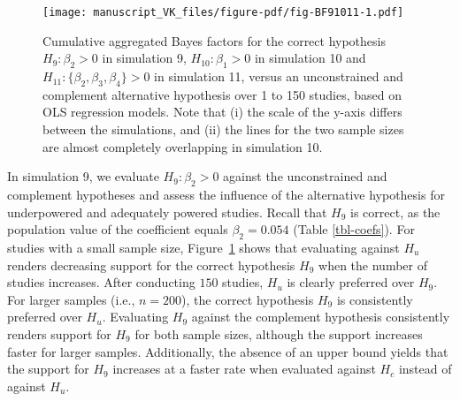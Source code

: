 \documentclass[
]{interact}
\begin{document}
                    \begin{figure}[!h]
                    
                    {\centering \texttt{[image: manuscript\_VK\_files/figure-pdf/fig-BF91011-1.pdf]}
                      
                    }
                    
                    \caption{\label{fig-BF91011}Cumulative aggregated Bayes factors for the
                      correct hypothesis \(H_9: \beta_2 > 0\) in simulation 9,
                      \(H_{10}: \beta_1 > 0\) in simulation 10 and
                      \(H_{11}: \{\beta_2, \beta_3, \beta_4\} > 0\) in simulation 11, versus
                      an unconstrained and complement alternative hypothesis over 1 to 150
                      studies, based on OLS regression models. Note that (i) the scale of the
                      y-axis differs between the simulations, and (ii) the lines for the two
                      sample sizes are almost completely overlapping in simulation 10.}
                    
                    \end{figure}
                    
                    In simulation 9, we evaluate \(H_9: \beta_2 > 0\) against the
                    unconstrained and complement hypotheses and assess the influence of the
                    alternative hypothesis for underpowered and adequately powered studies.
                    Recall that \(H_9\) is correct, as the population value of the
                    coefficient equals \(\beta_2 = 0.054\) (Table \ref{tbl-coefs}). For
                    studies with a small sample size, Figure~\ref{fig-BF91011} shows that
                    evaluating against \(H_u\) renders decreasing support for the correct
                    hypothesis \(H_9\) when the number of studies increases. After
                    conducting \(150\) studies, \(H_u\) is clearly preferred over \(H_9\).
                    For larger samples (i.e., \(n = 200\)), the correct hypothesis \(H_9\)
                    is consistently preferred over \(H_u\). Evaluating \(H_9\) against the
                    complement hypothesis consistently renders support for \(H_9\) for both
                    sample sizes, although the support increases faster for larger samples.
                    Additionally, the absence of an upper bound yields that the support for
                    \(H_9\) increases at a faster rate when evaluated against \(H_c\)
                    instead of against \(H_u\).
                    
\end{document}
